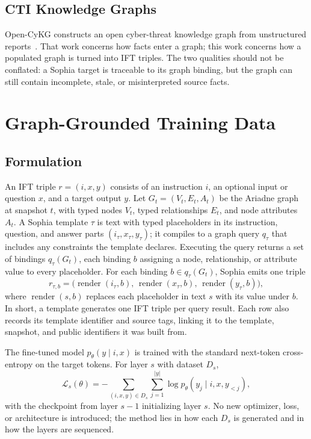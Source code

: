 \documentclass[conference]{IEEEtran}
\begin{document}
\subsection{CTI Knowledge Graphs}
Open-CyKG constructs an open cyber-threat knowledge graph from unstructured reports~\cite{sarhan2021opencykg}. That work concerns how facts enter a graph; this work concerns how a populated graph is turned into IFT triples. The two qualities should not be conflated: a Sophia target is traceable to its graph binding, but the graph can still contain incomplete, stale, or misinterpreted source facts.

\section{Graph-Grounded Training Data}\label{sec:data}
\subsection{Formulation}
An IFT triple $r=(i,x,y)$ consists of an instruction $i$, an optional input or question $x$, and a target output $y$. Let $G_t=(V_t,E_t,A_t)$ be the Ariadne graph at snapshot $t$, with typed nodes $V_t$, typed relationships $E_t$, and node attributes $A_t$. A Sophia template $\tau$ is text with typed placeholders in its instruction, question, and answer parts $(i_\tau,x_\tau,y_\tau)$; it compiles to a graph query $q_\tau$ that includes any constraints the template declares. Executing the query returns a set of bindings $q_\tau(G_t)$, each binding $b$ assigning a node, relationship, or attribute value to every placeholder. For each binding $b\in q_\tau(G_t)$, Sophia emits one triple
\begin{equation}
 r_{\tau,b}=\big(\operatorname{render}(i_\tau,b),\,\operatorname{render}(x_\tau,b),\,\operatorname{render}(y_\tau,b)\big),
\end{equation}
where $\operatorname{render}(s,b)$ replaces each placeholder in text $s$ with its value under $b$. In short, a template generates one IFT triple per query result. Each row also records its template identifier and source tags, linking it to the template, snapshot, and public identifiers it was built from.

The fine-tuned model $p_\theta(y\mid i,x)$ is trained with the standard next-token cross-entropy on the target tokens. For layer $s$ with dataset $D_s$,
\begin{equation}
 \mathcal{L}_s(\theta)=-\sum_{(i,x,y)\in D_s}\sum_{j=1}^{|y|}\log p_\theta(y_j\mid i,x,y_{<j}),
\end{equation}
with the checkpoint from layer $s-1$ initializing layer $s$. No new optimizer, loss, or architecture is introduced; the method lies in how each $D_s$ is generated and in how the layers are sequenced.
\end{document}
